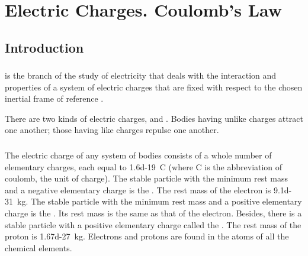 
\chapter{Electric Charges. Coulomb's Law}
\label{ch-14}

\section{Introduction}
\label{sec-14.1}

\subsection{}\label{14.1.1}  is the branch of the study of electricity that deals with the interaction and properties of a system of electric charges that are fixed with respect to the chosen inertial frame of reference .

There are two kinds of electric charges,  and . Bodies having unlike charges attract one another; those having like charges repulse one another.

\subsection{}\label{14.1.2} The electric charge of any system of bodies consists of a whole number of elementary charges, each equal to \SI{1.6d-19}{\coulomb} (where C is the abbreviation of coulomb, the unit of charge). The stable particle with the minimum rest mass  and a negative elementary charge is the . The rest mass of the electron is \SI{9.1d-31}{\kilo\gram}. The stable particle with the minimum rest mass and a positive elementary charge is the  . Its rest mass is the same as that of the electron. Besides, there is a stable particle with a positive elementary charge called the . The rest mass of the proton is \SI{1.67d-27}{\kilo\gram}. Electrons and protons are found in the atoms of all the chemical elements.

